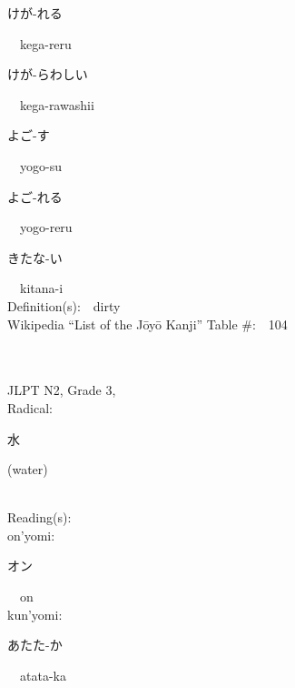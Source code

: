 \begin{multicols}{2}
{\hspace*{2em}}{\begin{CJK}{UTF8}{min} けが-れる \end{CJK}}\ \ kega-reru\ \ \\
{\hspace*{2em}}{\begin{CJK}{UTF8}{min} けが-らわしい \end{CJK}}\ \ kega-rawashii\ \ \\
{\hspace*{2em}}{\begin{CJK}{UTF8}{min} よご-す \end{CJK}}\ \ yogo-su\ \ \\
{\hspace*{2em}}{\begin{CJK}{UTF8}{min} よご-れる \end{CJK}}\ \ yogo-reru\ \ \\
{\hspace*{2em}}{\begin{CJK}{UTF8}{min} きたな-い \end{CJK}}\ \ kitana-i\ \ \\
Definition(s):\ \ dirty \\
Wikipedia ``List of the J\=oy\=o Kanji'' Table \#:\ \ 104 \\
\ \ \\
{\fontsize{34pt}{40pt}  }\ \ \\  %
{JLPT N2, Grade 3, \\Radical:\ \ {\begin{CJK}{UTF8}{min} 水 \end{CJK}} (water) } \\
Reading(s):\ \ \\
{\hspace*{1em}}on'yomi:\ \ \\
{\hspace*{2em}}{\begin{CJK}{UTF8}{min} オン \end{CJK}}\ \ on\ \ \\
{\hspace*{1em}}kun'yomi:\ \ \\
{\hspace*{2em}}{\begin{CJK}{UTF8}{min} あたた-か \end{CJK}}\ \ atata-ka\ \ \\

\end{multicols}
